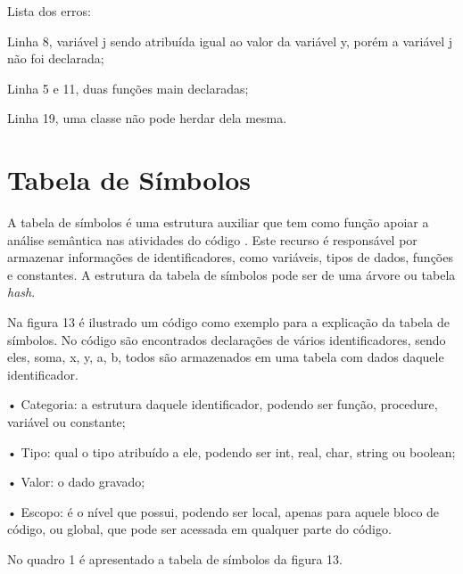 \documentclass[12pt,oneside,a4paper,chapter=TITLE,section=TITLE,sumario=tradicional]{abntex2}
\begin{document}
\begin{figure}[H]
\end{figure}

Lista dos erros:

\begin{lista}
	\item Linha 8, variável j sendo atribuída igual ao valor da variável y, porém a variável j não foi declarada;
	\item Linha 5 e 11, duas funções main declaradas;
	\item Linha 19, uma classe não pode herdar dela mesma.
\end{lista}

\section{Tabela de Símbolos}
\label{sec:tabela-semantica}

A tabela de símbolos é uma estrutura auxiliar que tem como função apoiar a análise semântica nas atividades do código \cite{ricarte2008}. Este recurso é responsável por armazenar informações de identificadores, como variáveis, tipos de dados, funções e constantes. A estrutura da tabela de símbolos pode ser de uma árvore ou tabela \textit{hash}.

Na figura 13 é ilustrado um código como exemplo para a explicação da tabela de símbolos. No código são encontrados declarações de vários identificadores, sendo eles, soma, x, y, a, b, todos são armazenados em uma tabela com dados daquele identificador.

\begin{figure}[htb]
\end{figure}

•	Categoria: a estrutura daquele identificador, podendo ser função, procedure, variável ou constante;

•	Tipo: qual o tipo atribuído a ele, podendo ser int, real, char, string ou boolean;

•	Valor: o dado gravado;

•	Escopo: é o nível que possui, podendo ser local, apenas para aquele bloco de código, ou global, que pode ser acessada em qualquer parte do código.

No quadro 1 é apresentado a tabela de símbolos da figura 13.
\end{document}

